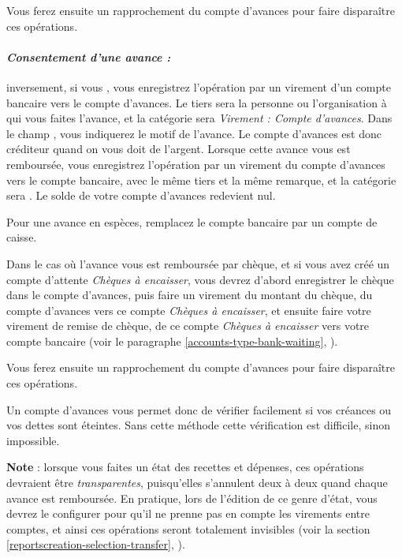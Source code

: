 Vous ferez ensuite un rapprochement du compte d'avances pour faire disparaître ces opérations.

\paragraph{\textsl{Consentement d'une avance  :}} inversement, si vous , vous enregistrez l'opération par un virement d'un compte bancaire vers le compte d'avances. Le tiers sera la personne ou l'organisation à qui vous faites l'avance, et la catégorie sera \emph{Virement : Compte d'avances}. Dans le champ , vous indiquerez le motif de l'avance. Le compte d'avances est donc créditeur quand on vous doit de l'argent. Lorsque cette avance vous est remboursée, vous enregistrez l'opération par un virement du compte d'avances vers le compte bancaire, avec le même tiers et la même remarque, et la catégorie sera . Le solde de votre compte d'avances redevient nul.

Pour une avance en espèces, remplacez le compte bancaire par un compte de caisse.

Dans le cas où l'avance vous est remboursée par chèque, et si vous avez créé un compte d'attente  \emph{Chèques à encaisser}, vous devrez d'abord enregistrer le chèque dans le compte d'avances, puis faire un virement du montant du chèque, du compte d'avances vers ce compte \emph{Chèques à encaisser}, et ensuite faire votre virement de remise de chèque, de ce compte \emph{Chèques à encaisser} vers votre compte bancaire  (voir le paragraphe \vref{accounts-type-bank-waiting}, ). 

Vous ferez ensuite un rapprochement du compte d'avances pour faire disparaître ces opérations.

Un compte d'avances vous permet donc de vérifier facilement si vos créances ou vos dettes sont éteintes. Sans cette méthode cette vérification est difficile, sinon impossible.

\textbf{Note} : lorsque vous faites un état des recettes et dépenses, ces opérations devraient être \emph{transparentes}, puisqu'elles s'annulent deux à deux quand chaque avance est remboursée. En pratique, lors de l'édition de ce genre d'état, vous devrez le configurer pour qu'il ne prenne pas en compte les virements entre comptes, et ainsi ces opérations seront totalement invisibles (voir la section \vref{reportscreation-selection-transfer}, ).


